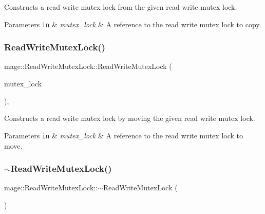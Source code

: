 Constructs a read write mutex lock from the given read write mutex lock.


\begin{DoxyParams}[1]{Parameters}
\mbox{\tt in}  & {\em mutex\+\_\+lock} & A reference to the read write mutex lock to copy. \\
\hline
\end{DoxyParams}
\hypertarget{structmage_1_1_read_write_mutex_lock_ac1c42cf89476d5e48e35d8b3fb05dc70}{}\label{structmage_1_1_read_write_mutex_lock_ac1c42cf89476d5e48e35d8b3fb05dc70} 
\subsubsection{\texorpdfstring{Read\+Write\+Mutex\+Lock()}{ReadWriteMutexLock()}\hspace{0.1cm}{\footnotesize\ttfamily [3/3]}}
{\footnotesize\ttfamily mage\+::\+Read\+Write\+Mutex\+Lock\+::\+Read\+Write\+Mutex\+Lock (\begin{DoxyParamCaption}\item[{\hyperlink{structmage_1_1_read_write_mutex_lock}{Read\+Write\+Mutex\+Lock} \&\&}]{mutex\+\_\+lock }\end{DoxyParamCaption})\hspace{0.3cm}{\ttfamily [default]}, {\ttfamily [noexcept]}}

Constructs a read write mutex lock by moving the given read write mutex lock.


\begin{DoxyParams}[1]{Parameters}
\mbox{\tt in}  & {\em mutex\+\_\+lock} & A reference to the read write mutex lock to move. \\
\hline
\end{DoxyParams}
\hypertarget{structmage_1_1_read_write_mutex_lock_a64b600234d29ba7307fcd77a17486582}{}\label{structmage_1_1_read_write_mutex_lock_a64b600234d29ba7307fcd77a17486582} 
\subsubsection{\texorpdfstring{$\sim$\+Read\+Write\+Mutex\+Lock()}{~ReadWriteMutexLock()}}
{\footnotesize\ttfamily mage\+::\+Read\+Write\+Mutex\+Lock\+::$\sim$\+Read\+Write\+Mutex\+Lock (\begin{DoxyParamCaption}{ }\end{DoxyParamCaption})}

